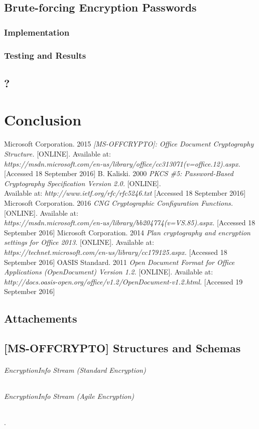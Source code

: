 \documentclass[11pt,oneside]{fithesis2}
\begin{document}
\section{Brute-forcing Encryption Passwords}

\subsection{Implementation}

\subsection{Testing and Results}

\section{?}

\chapter{Conclusion}

\begin{thebibliography}{}
	Microsoft Corporation. 2015 \textit{[MS-OFFCRYPTO]: Office Document Cryptography Structure.} [ONLINE].
Available at: \\ \textit{https://msdn.microsoft.com/en-us/library/office/cc313071(v=office.12).aspx.} [Accessed 18 September 2016]
	 B. Kaliski. 2000 \textit{PKCS \#5: Password-Based Cryptography Specification Version 2.0.} [ONLINE].\\ Available at: \textit{http://www.ietf.org/rfc/rfc5246.txt} [Accessed 18 September 2016]
	Microsoft Corporation. 2016 \textit{CNG Cryptographic Configuration Functions.} [ONLINE].
Available at: \\ \textit{https://msdn.microsoft.com/en-us/library/bb204774(v=VS.85).aspx.} [Accessed 18 September 2016]
	Microsoft Corporation. 2014 \textit{Plan cryptography and encryption settings for Office 2013.} [ONLINE].
Available at: \\ \textit{https://technet.microsoft.com/en-us/library/cc179125.aspx.} [Accessed 18 September 2016]
	OASIS Standard. 2011 \textit{Open Document Format for Office Applications (OpenDocument) Version 1.2.} [ONLINE]. Available at: \textit{http://docs.oasis-open.org/office/v1.2/OpenDocument-v1.2.html.} [Accessed 19 September 2016]
\end{thebibliography}

\begin{appendix}
	\chapter{Attachements}
	\section{[MS-OFFCRYPTO] Structures and Schemas}\label{msoffcrypto_structs}
	\subparagraph{EncryptionInfo Stream (Standard Encryption)}\label{ei_standardstream}

	\subparagraph{EncryptionInfo Stream (Agile Encryption)}\label{ei_agilestream}.
\end{appendix}
\end{document}
